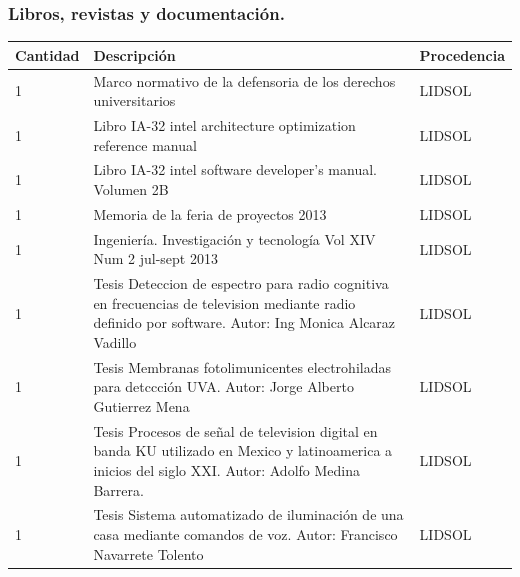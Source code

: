 \documentclass[a4paper,11pt]{article}                 %
\begin{document}
  \subsubsection{Libros, revistas y documentación.}
  
\begin{longtable}{|p{}|p{}|p{}|}
\hline
Cantidad & Descripción                                                                                                                                               & Procedencia \\ \hline
1        & Marco normativo de la defensoria de los derechos universitarios                                                                                        & LIDSOL      \\ \hline
1        & Libro IA-32 intel architecture optimization reference manual                                                                                           & LIDSOL      \\ \hline
1        & Libro IA-32 intel software developer's manual. Volumen 2B                                                                                              & LIDSOL      \\ \hline
1        & Memoria de la feria de proyectos 2013                                                                                                                  & LIDSOL      \\ \hline
1        & Ingeniería. Investigación y tecnología Vol XIV Num 2 jul-sept 2013                                                                                     & LIDSOL      \\ \hline
1        & Tesis Deteccion de espectro para radio cognitiva en frecuencias de television mediante radio definido por software.  Autor: Ing Monica Alcaraz Vadillo & LIDSOL      \\ \hline
1        & Tesis Membranas fotolimunicentes electrohiladas para detccción UVA. Autor: Jorge Alberto Gutierrez Mena                                                & LIDSOL      \\ \hline
1        & Tesis Procesos de señal de television digital en banda KU utilizado en Mexico y latinoamerica a inicios del siglo XXI. Autor: Adolfo Medina Barrera.   & LIDSOL      \\ \hline
1        & Tesis Sistema automatizado de iluminación de una casa mediante comandos de voz. Autor: Francisco Navarrete Tolento                                     & LIDSOL      \\ \hline

\end{longtable}
\end{document}
